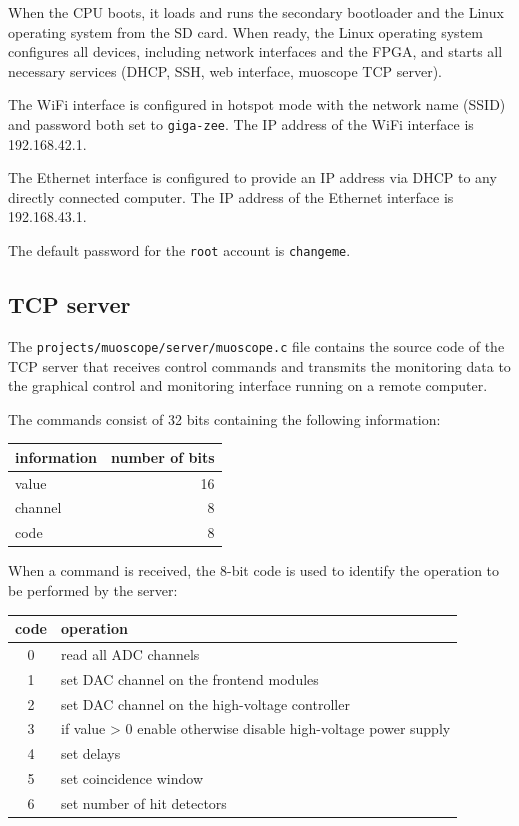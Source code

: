 \documentclass[12pt, a4paper]{article}
\begin{document}
When the CPU boots, it loads and runs the secondary bootloader and the Linux operating system from the SD card. When ready, the Linux operating system configures all devices, including network interfaces and the FPGA, and starts all necessary services (DHCP, SSH, web interface, muoscope TCP server).

The WiFi interface is configured in hotspot mode with the network name (SSID) and password both set to \texttt{giga-zee}. The IP address of the WiFi interface is 192.168.42.1.

The Ethernet interface is configured to provide an IP address via DHCP to any directly connected computer. The IP address of the Ethernet interface is 192.168.43.1.

The default password for the \texttt{root} account is \texttt{changeme}.

\subsection{TCP server}

The \texttt{projects/muoscope/server/muoscope.c} file contains the source code of the TCP server that receives control commands and transmits the monitoring data to the graphical control and monitoring interface running on a remote computer.

The commands consist of 32 bits containing the following information:
\begin{center}
  \begin{tabular}{|l|r|}
  \hline
  \textbf{information} & \textbf{number of bits} \\
  \hline
  value & 16 \\
  \hline
  channel & 8 \\
  \hline
  code & 8 \\
  \hline
  \end{tabular}
\end{center}

When a command is received, the 8-bit code is used to identify the operation to be performed by the server:
\begin{center}
  \begin{tabular}{|c|l|}
  \hline
  \textbf{code} & \textbf{operation} \\
  \hline
  0 & read all ADC channels \\
  \hline
  1 & set DAC channel on the frontend modules \\
  \hline
  2 & set DAC channel on the high-voltage controller \\
  \hline
  3 & if value > 0 enable otherwise disable high-voltage power supply \\
  \hline
  4 & set delays \\
  \hline
  5 & set coincidence window \\
  \hline
  6 & set number of hit detectors \\
  \hline
  \end{tabular}
\end{center}
\end{document}
